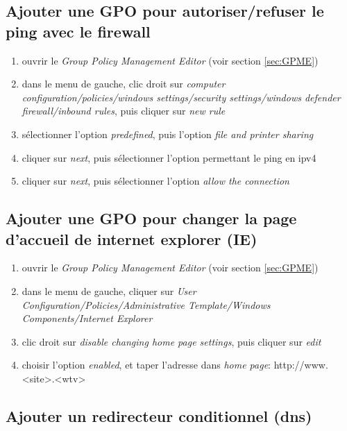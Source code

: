 \documentclass[a4paper]{article}
\begin{document}
\subsection{Ajouter une GPO pour autoriser/refuser le ping avec le firewall}



\begin{enumerate}
    \item ouvrir le \textit{Group Policy Management Editor} (voir section \ref{sec:GPME})
    \item dans le menu de gauche, clic droit sur \textit{computer configuration/policies/windows settings/security settings/windows defender firewall/inbound rules}, puis cliquer sur \textit{new rule}
    \item sélectionner l'option \textit{predefined}, puis l'option \textit{file and printer sharing}
    \item cliquer sur \textit{next}, puis sélectionner l'option permettant le ping en ipv4
    \item cliquer sur \textit{next}, puis sélectionner l'option \textit{allow the connection}
\end{enumerate}





\subsection{Ajouter une GPO pour changer la page d'accueil de internet explorer (IE)}



\begin{enumerate}
    \item ouvrir le \textit{Group Policy Management Editor} (voir section \ref{sec:GPME})
    \item dans le menu de gauche, cliquer sur \textit{User Configuration/Policies/Administrative Template/Windows Components/Internet Explorer}
    \item clic droit sur \textit{disable changing home page settings}, puis cliquer sur \textit{edit}
    \item choisir l'option \textit{enabled}, et taper l'adresse dans \textit{home page}: http://www.<site>.<wtv>
\end{enumerate}





\subsection{Ajouter un redirecteur conditionnel (dns)}
\end{document}
